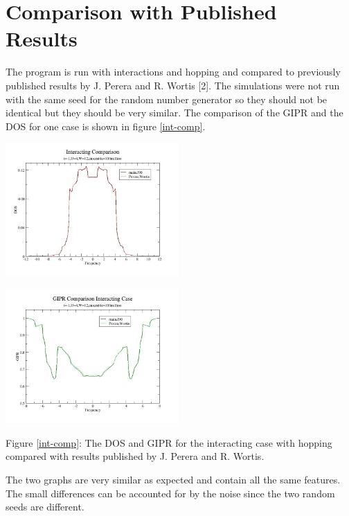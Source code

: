 \documentclass{article}
\begin{document}
\section{Comparison with Published Results}
The program is run with interactions and hopping and compared to previously published results by J. Perera and R. Wortis [2]. The simulations were not run with the same seed for the random number generator so they should not be identical but they should be very similar. The comparison of the GIPR and the DOS for one case is shown in figure \ref{int-comp}.
\begin{multicols}{2}
\begin{center}
	\includegraphics[width=250px]{dos_compareu4.jpg} \\ \label{int-comp}
\end{center}
\begin{center}
	\includegraphics[width=250px]{gipr_compareu4.jpg} \\
\end{center}
\end{multicols}
\begin{center}
Figure \ref{int-comp}: The DOS and GIPR for the interacting case with hopping compared with results published by J. Perera and R. Wortis.
\end{center}
The two graphs are very similar as expected and contain all the same features. The small differences can be accounted for by the noise since the two random seeds are different.
\end{document}
